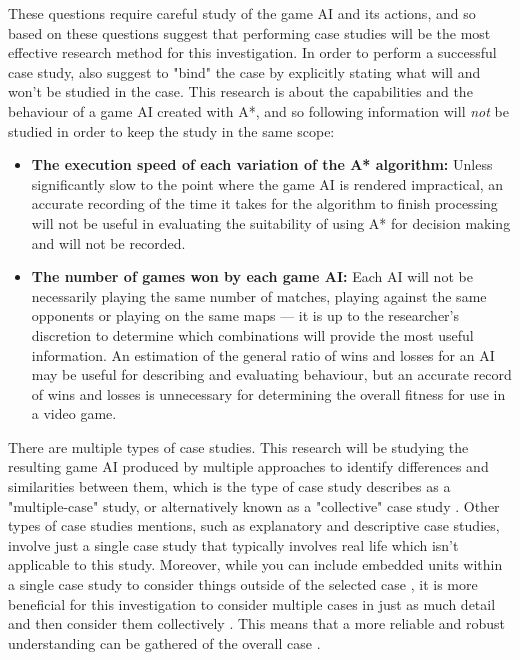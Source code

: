 \documentclass[11pt, a4paper]{report}
\begin{document}
These questions require careful study of the game AI and its actions, and so based on these questions \citeauthor{baxter2008qualitative} \parencite*[545]{baxter2008qualitative} suggest that performing case studies will be the most effective research method for this investigation. In order to perform a successful case study, \citeauthor{baxter2008qualitative} \parencite*[546]{baxter2008qualitative} also suggest to "bind" the case by explicitly stating what will and won't be studied in the case. This research is about the capabilities and the behaviour of a game AI created with A*, and so following information will \emph{not} be studied in order to keep the study in the same scope:

\begin{itemize}
\item \textbf{The execution speed of each variation of the A* algorithm:} Unless significantly slow to the point where the game AI is rendered impractical, an accurate recording of the time it takes for the algorithm to finish processing will not be useful in evaluating the suitability of using A* for decision making and will not be recorded.
\item \textbf{The number of games won by each game AI:} Each AI will not be necessarily playing the same number of matches, playing against the same opponents or playing on the same maps --- it is up to the researcher's discretion to determine which combinations will provide the most useful information. An estimation of the general ratio of wins and losses for an AI may be useful for describing and evaluating behaviour, but an accurate record of wins and losses is unnecessary for determining the overall fitness for use in a video game.
\end{itemize}

There are multiple types of case studies. This research will be studying the resulting game AI produced by multiple approaches to identify differences and similarities between them, which is the type of case study \citeauthor{yin2003k} \parencite*{yin2003k} describes as a "multiple-case" study, or alternatively known as a "collective" case study \parencite{stake1995art}. Other types of case studies \citeauthor{yin2003k} \parencite*{yin2003k} mentions, such as explanatory and descriptive case studies, involve just a single case study that typically involves real life which isn't applicable to this study. Moreover, while you can include embedded units within a single case study to consider things outside of the selected case \parencite[550]{baxter2008qualitative}, it is more beneficial for this investigation to consider multiple cases in just as much detail and then consider them collectively \parencite[555]{baxter2008qualitative}. This means that a more reliable and robust understanding can be gathered of the overall case \parencite[550]{baxter2008qualitative}.
\end{document}
